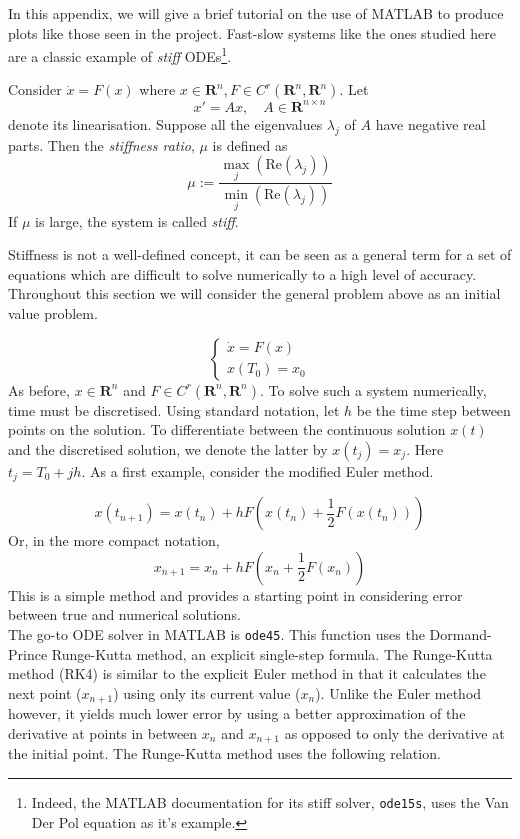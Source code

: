 
In this appendix, we will give a brief tutorial on the use of MATLAB to produce plots like those seen in the project. Fast-slow systems like the ones studied here are a classic example of \emph{stiff} ODEs\footnote{Indeed, the MATLAB documentation for its stiff solver, \texttt{ode15s}, uses the Van Der Pol equation as it's example.}. 
\begin{definition}
	Consider $\dot{x} = F(x)$ where $x\in \mathbf{R}^n, F\in C^r(\mathbf{R}^n,\mathbf{R}^n)$. Let 
	$$ x' = Ax,\quad A\in \mathbf{R}^{n \times n}  $$
	denote its linearisation. Suppose all the eigenvalues $\lambda_j$  of $A$ have negative real parts. Then the \emph{stiffness ratio}, $\mu$ is defined as
	$$ \mu :=\frac{\max_j(\mathrm{Re}(\lambda_j))}{\min_j(\mathrm{Re}(\lambda_j))} $$
	If $\mu$ is large, the system is called \emph{stiff}.
\end{definition}
Stiffness is not a well-defined concept, it can be seen as a general term for a set of equations which are difficult to solve numerically to a high level of accuracy. Throughout this section we will consider the general problem above as an initial value problem.

$$ \begin{cases}
\dot{x} = F(x)\\
x(T_0)=x_0
\end{cases}$$
As before, $x\in \mathbf{R}^n$ and $ F\in C^r(\mathbf{R}^n,\mathbf{R}^n)$. To solve such a system numerically, time must be discretised. Using standard notation, let $h$ be the time step between points on the solution. To differentiate between the continuous solution $x(t)$ and the discretised solution, we denote the latter by $x(t_j)=x_j$. Here $t_j = T_0+jh$. As a first example, consider the modified Euler method.

$$ x(t_{n+1})=x(t_n)+hF\left( x(t_n) +\frac{1}{2}F(x(t_n))\right)$$
Or, in the more compact notation, 
$$x_{n+1}=x_n+hF\left( x_n +\frac{1}{2}F(x_n)\right)$$
This is a simple method and provides a starting point in considering error between true and numerical solutions.\\

The go-to ODE solver in MATLAB is \texttt{ode45}. This function uses the Dormand-Prince Runge-Kutta method, an explicit single-step formula. The Runge-Kutta method (RK4) is similar to the explicit Euler method in that it calculates the next point ($x_{n+1}$) using only its current value ($x_n$). Unlike the Euler method however, it yields much lower error by using a better approximation of the derivative at points in between $x_n$ and $x_{n+1}$ as opposed to only the derivative at the initial point. The Runge-Kutta method uses the following relation.


